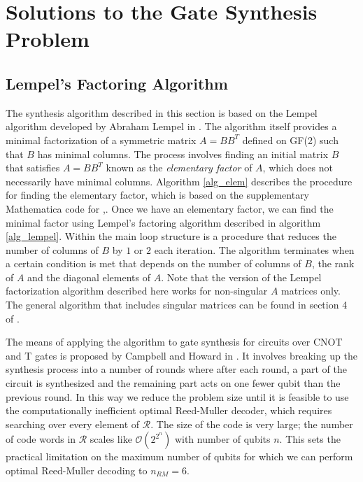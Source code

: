 \documentclass{article}
\theoremstyle{definition}
\theoremstyle{problem}
\theoremstyle{lemma}
\begin{document}
	\FloatBarrier
	\section{Solutions to the Gate Synthesis Problem}
	\label{s4_Solution}
		\FloatBarrier
		\subsection{Lempel's Factoring Algorithm}
		\label{s_Lempel}
		The synthesis algorithm described in this section is based on the Lempel algorithm developed by Abraham Lempel in \cite{36_Lempel_1975}. The algorithm itself provides a minimal factorization of a symmetric matrix $A=BB^T$ defined on GF(2) such that $B$ has minimal columns. The process involves finding an initial matrix $B$ that satisfies $A=BB^T$  known as the \emph{elementary factor} of $A$, which does not necessarily have minimal columns. Algorithm \ref{alg_elem} describes the procedure for finding the elementary factor, which is based on the supplementary Mathematica code for \cite{1_Campbell_2017},\cite{40_Campbell_web}. Once we have an elementary factor, we can find the minimal factor using Lempel's factoring algorithm described in algorithm \ref{alg_lempel}. Within the main loop structure is a procedure that reduces the number of columns of $B$ by $1$ or $2$ each iteration. The algorithm terminates when a certain condition is met that depends on the number of columns of $B$, the rank of $A$ and the diagonal elements of $A$. Note that the version of the Lempel factorization algorithm described here works for non-singular $A$ matrices only. The general algorithm that includes singular matrices can be found in section 4 of \cite{36_Lempel_1975}.
		
		 The means of applying the algorithm to gate synthesis for circuits over CNOT and T gates is proposed by Campbell and Howard in \cite{1_Campbell_2017}. It involves breaking up the synthesis process into a number of rounds where after each round, a part of the circuit is synthesized and the remaining part acts on one fewer qubit than the previous round. In this way we reduce the problem size until it is feasible to use the computationally inefficient optimal Reed-Muller decoder, which requires searching over every element of $\mathcal{R}$. The size of the code is very large; the number of code words in $\mathcal{R}$ scales like $\mathcal{O}(2^{2^n})$ with number of qubits $n$. This sets the practical limitation on the maximum number of qubits for which we can perform optimal Reed-Muller decoding to $n_{RM}=6$.
		 
\end{document}
